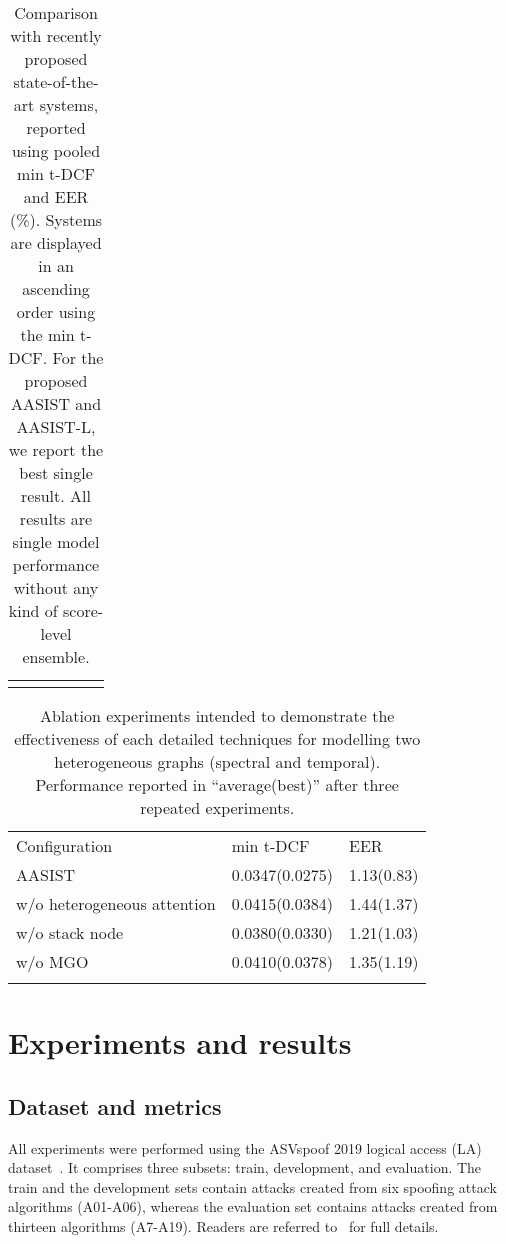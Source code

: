 \documentclass{article}
\begin{document}
\begin{table*}[!t]
\begin{tabularx}{\linewidth}{lcYYYY}
\Xhline{1pt}
	\end{tabularx}
	\caption{
	    Comparison with recently proposed state-of-the-art systems, reported using pooled min t-DCF and EER (\%). 
	    Systems are displayed in an ascending order using the min t-DCF. 
	    For the proposed AASIST and AASIST-L, we report the best single result. 
	    All results are single model performance without any kind of score-level ensemble.
	}
 	\vspace{-10pt}
	\label{tab:sotaNsmall}
\end{table*} \begin{table}[!t]
	\centering
	\small
	\begin{tabularx}{\columnwidth}{lYY}
    \Xhline{1pt}
	 Configuration & min t-DCF& EER	\\ 
    \Xhline{1pt}
	 AASIST & 0.0347(0.0275) & 1.13(0.83)\\
	 \hline\hline
	 w/o heterogeneous attention & 0.0415(0.0384) & 1.44(1.37)\\
	 \hline
w/o stack node & 0.0380(0.0330) & 1.21(1.03)\\
	 \hline
	 w/o MGO & 0.0410(0.0378) & 1.35(1.19)\\


    \Xhline{1pt}
	\end{tabularx}
	\caption{
	  Ablation experiments intended to demonstrate the effectiveness of each detailed techniques for modelling two heterogeneous graphs (spectral and temporal). Performance reported in ``average(best)'' after three repeated experiments.  
	}
 	\vspace{-10pt}
	\label{tab:ablations}
\end{table} 
\section{Experiments and results}
\label{sec:ExpAndResult}
\subsection{Dataset and metrics}
\label{ssec:database}
All experiments were performed using the ASVspoof 2019 logical access (LA) dataset~\cite{todisco2019asvspoof,wang2020asvspoof}.
It comprises three subsets: train, development, and evaluation. 
The train and the development sets contain attacks created from six spoofing attack algorithms (A01-A06), whereas the evaluation set contains attacks created from thirteen algorithms (A7-A19).
Readers are referred to~\cite{wang2020asvspoof} for full details.
\end{document}
